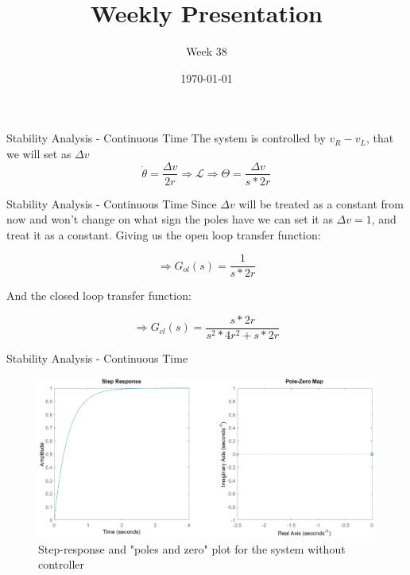\documentclass{beamer}
\title{Weekly Presentation}
\subtitle{Week 38}
\author{}
\institute{Luleå University of Technology}
\date{\today}
\begin{document}




\begin{frame}{Stability Analysis - Continuous Time}
    The system is controlled by $v_R-v_L$, that we will set as $\Delta v$
    \begin{equation}
        \dot{\theta} = \frac{\Delta v}{2r} \Rightarrow \mathcal{L} \Rightarrow \Theta = \frac{\Delta v}{s*2r} 
    \end{equation}
\end{frame}




\begin{frame}{Stability Analysis - Continuous Time}
    Since $\Delta v$ will be treated as a constant from now and won't change on what sign the poles have we can set it as $\Delta v = 1$, and treat it as a constant. Giving us the open loop transfer function:
    
    \begin{equation}
        \Rightarrow G_{ol}(s) = \frac{1}{s*2r} 
    \end{equation}
    
    And the closed loop transfer function:
    
    \begin{equation}
         \Rightarrow G_{cl}(s) = \frac{s*2r}{s^2*4r^2+s*2r} 
    \end{equation}
    
    
\end{frame}






\begin{frame}{Stability Analysis - Continuous Time}


\begin{figure}
    \centering
    \includegraphics[width=1\textwidth]{no_controller.eps}
    \caption{Step-response and "poles and zero" plot for the system without controller}
    \label{fig:my_label}
\end{figure}

\end{frame}
\end{document}
